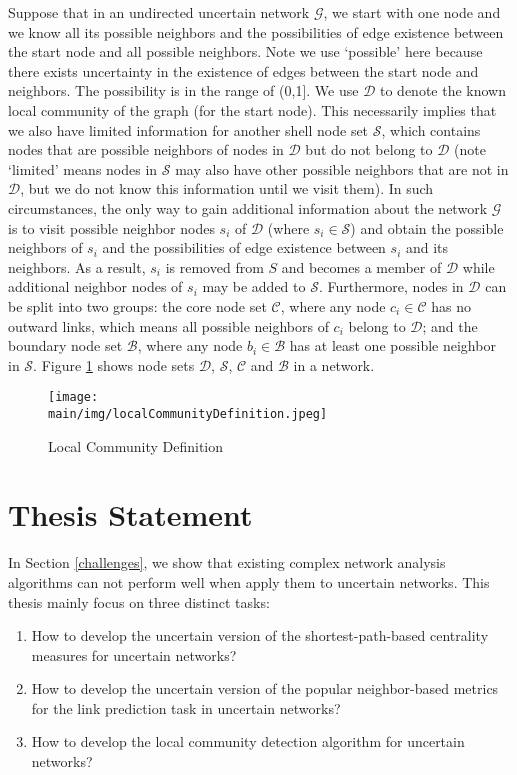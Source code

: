 \documentclass[\main/thesis.tex]{subfiles}
\begin{document}
Suppose that in an undirected uncertain network $\mathcal{G}$, we start with one node and we know all its possible neighbors and the possibilities of edge existence between the start node and all possible neighbors. Note we use `possible' here because there exists uncertainty in the existence of edges between the start node and neighbors. The possibility is in the range of (0,1]. We use $\mathcal{D}$ to denote the known local community of the graph (for the start node). This necessarily implies that we also have limited information for another shell node set $\mathcal{S}$, which contains nodes that are possible neighbors of nodes in $\mathcal{D}$ but do not belong to $\mathcal{D}$ (note `limited' means nodes in $\mathcal{S}$ may also have other possible neighbors that are not in $\mathcal{D}$, but we do not know this information until we visit them). In such circumstances, the only way to gain additional information about the network $\mathcal{G}$ is to visit possible neighbor nodes $s_i$ of $\mathcal{D}$ (where $s_i\in \mathcal{S}$) and obtain the possible neighbors of $s_i$ and the possibilities of edge existence between $s_i$ and its neighbors. As a result, $s_i$ is removed from $S$ and becomes a member of $\mathcal{D}$ while additional neighbor nodes of $s_i$ may be added to $\mathcal{S}$. Furthermore, nodes in $\mathcal{D}$ can be split into two groups: the core node set $\mathcal{C}$, where any node $c_i\in \mathcal{C}$ has no outward links, which means all possible neighbors of $c_i$ belong to $\mathcal{D}$; and the boundary node set $\mathcal{B}$, where any node $b_i\in \mathcal{B}$ has at least one possible neighbor in $\mathcal{S}$. Figure \ref{Local_Community_Definition} shows node sets $\mathcal{D}$, $\mathcal{S}$, $\mathcal{C}$ and $\mathcal{B}$ in a network.

\begin{figure}
\centering
\texttt{[image: \\main/img/localCommunityDefinition.jpeg]}
\caption{Local Community Definition}
\label{Local_Community_Definition}
\end{figure}

\section{Thesis Statement}
In Section \ref{challenges}, we show that existing complex network analysis algorithms can not perform well when apply them to uncertain networks. This thesis mainly focus on three distinct tasks:
\begin{enumerate}
\item How to develop the uncertain version of the shortest-path-based centrality measures for uncertain networks?
\item How to develop the uncertain version of the popular neighbor-based metrics for the link prediction task in uncertain networks?
\item How to develop the local community detection algorithm for uncertain networks?
\end{enumerate}
\end{document}
